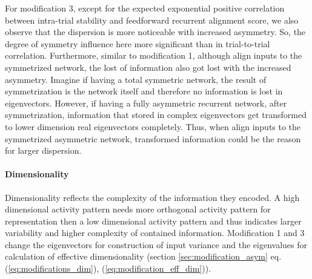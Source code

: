 \documentclass[11pt]{article}
\begin{document}
	For modification 3, except for the expected exponential positive correlation between intra-trial stability and feedforward recurrent alignment score, we also observe that the dispersion is more noticeable with increased asymmetry. So, the degree of symmetry influence here more significant than in trial-to-trial correlation. Furthermore, similar to modification 1, although align inputs to the symmetrized network, the lost of information also got lost with the increased asymmetry. Imagine if having a total symmetric network, the result of symmetrization is the network itself and therefore no information is lost in eigenvectors. However, if having a fully asymmetric recurrent network, after symmetrization, information that stored in complex eigenvectors get transformed to lower dimension real eigenvectors completely. Thus, when align inputs to the symmetrized asymmetric network, transformed information could be the reason for larger dispersion. 
	
	\paragraph{Dimensionality}
	
	Dimensionality reflects the complexity of the information they encoded. A high dimensional activity pattern needs more orthogonal activity pattern for representation then a low dimensional activity pattern and thus indicates larger variability and higher complexity of contained information. Modification 1 and 3 change the eigenvectors for construction of input variance and the eigenvalues for calculation of effective dimensionality (section \ref{sec:modification_asym} eq. (\ref{eq:modifications_dim}), (\ref{eq:modification_eff_dim})). 
	
\end{document}
